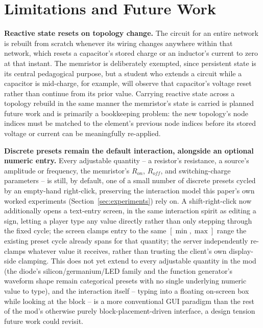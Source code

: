 \section{Limitations and Future Work}
\label{sec:limitations}

\textbf{Reactive state resets on topology change.} The circuit for an entire network is
rebuilt from scratch whenever its wiring changes anywhere within that network, which resets
a capacitor's stored charge or an inductor's current to zero at that instant. The memristor
is deliberately exempted, since persistent state is its central pedagogical purpose, but a
student who extends a circuit while a capacitor is mid-charge, for example, will observe
that capacitor's voltage reset rather than continue from its prior value. Carrying reactive
state across a topology rebuild in the same manner the memristor's state is carried is
planned future work and is primarily a bookkeeping problem: the new topology's node indices
must be matched to the element's previous node indices before its stored voltage or current
can be meaningfully re-applied.

\textbf{Discrete presets remain the default interaction, alongside an optional numeric
entry.} Every adjustable quantity -- a resistor's resistance, a source's amplitude or
frequency, the memristor's $R_{on}$, $R_{off}$, and switching-charge parameters -- is still,
by default, one of a small number of discrete presets cycled by an empty-hand right-click,
preserving the interaction model this paper's own worked experiments
(Section~\ref{sec:experiments}) rely on. A shift-right-click now additionally opens a
text-entry screen, in the same interaction spirit as editing a sign, letting a player type
any value directly rather than only stepping through the fixed cycle; the screen clamps
entry to the same $[\min,\max]$ range the existing preset cycle already spans for that
quantity; the server independently re-clamps whatever value it receives, rather than trusting
the client's own display-side clamping. This does not yet extend to every adjustable
quantity in the mod (the diode's silicon/germanium/LED family and the function generator's
waveform shape remain categorical presets with no single underlying numeric value to type),
and the interaction itself -- typing into a floating on-screen box while looking at the
block -- is a more conventional GUI paradigm than the rest of the mod's otherwise
purely block-placement-driven interface, a design tension future work could revisit.


